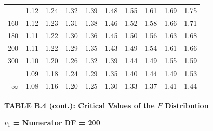 \documentclass[10pt]{article}
\begin{document}
\begin{longtable}{@{}r!{\vrule width 0.8pt\hspace{0.55em}}rrrrrrrrr@{}}
 & 1.12 & 1.24 & 1.32 & 1.39 & 1.48 & 1.55 & 1.61 & 1.69 & 1.75 \\
160 & 1.12 & 1.23 & 1.31 & 1.38 & 1.46 & 1.52 & 1.58 & 1.66 & 1.71 \\
180 & 1.11 & 1.22 & 1.30 & 1.36 & 1.45 & 1.50 & 1.56 & 1.63 & 1.68 \\
200 & 1.11 & 1.22 & 1.29 & 1.35 & 1.43 & 1.49 & 1.54 & 1.61 & 1.66 \\
300 & 1.10 & 1.20 & 1.26 & 1.32 & 1.39 & 1.44 & 1.49 & 1.55 & 1.59 \\
 & 1.09 & 1.18 & 1.24 & 1.29 & 1.35 & 1.40 & 1.44 & 1.49 & 1.53 \\
$\infty$ & 1.08 & 1.16 & 1.20 & 1.25 & 1.30 & 1.33 & 1.37 & 1.41 & 1.44 \\
\end{longtable}
\newpage
\thispagestyle{empty}
\begin{center}
{\large\bfseries TABLE B.4 (cont.): Critical Values of the $F$ Distribution\par}
\end{center}
{\large\bfseries $v_1$ = Numerator DF = 200\par}
\vspace{0.5em}
\small
\end{document}
